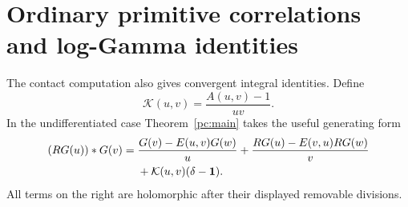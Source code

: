 \documentclass[11pt,a4paper]{article}
\numberwithin{equation}{section}
\theoremstyle{definition}
\newcommand{\JF}{\mathcal K}
\newcommand{\one}{\mathbf 1}
\begin{document}
\section{Ordinary primitive correlations and log-Gamma identities}\label{pc:ordinary}
The contact computation also gives convergent integral identities. Define
\begin{equation}\label{pc:K00}
\JF(u,v)=\frac{A(u,v)-1}{uv}.
\end{equation}
In the undifferentiated case Theorem~\ref{pc:main} takes the useful generating form
\begin{align}
(RG(u))*G(v)={}&\frac{G(v)-E(u,v)G(w)}u
+\frac{RG(u)-E(v,u)RG(w)}v\notag\\
&+\JF(u,v)(\delta-\one).\label{pc:global-generator}
\end{align}
All terms on the right are holomorphic after their displayed removable divisions.
\end{document}

